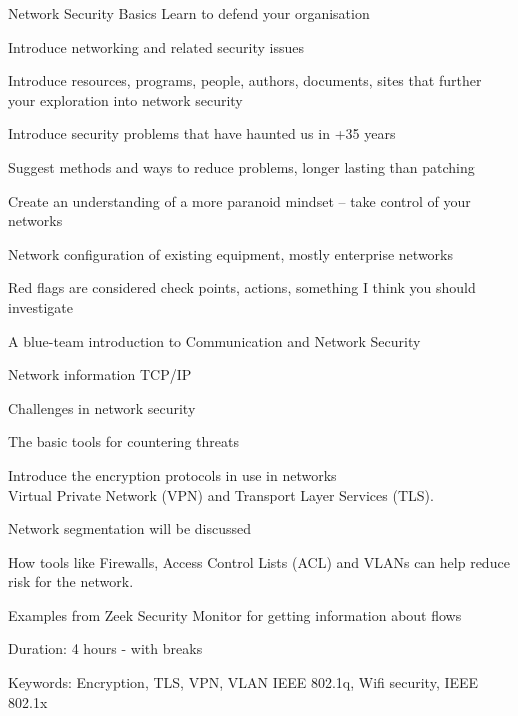 \documentclass[Screen16to9,17pt]{foils}
\begin{document}
\mytitlepage
{Network Security Basics}
{Learn to defend your organisation}

\hlkprofiluk




\begin{list2}
\item Introduce networking and related security issues
\item Introduce resources, programs, people, authors, documents, sites
 that further your exploration into network security
\item Introduce security problems that have haunted us in +35 years
\item Suggest methods and ways to reduce problems, longer lasting than patching
\item Create an understanding of a more paranoid mindset -- take control of your networks
\item Network configuration of existing equipment, mostly enterprise networks
{\myalert}
\end{list2}
{\small Red flags are considered check points, actions, something I think you should investigate}


A blue-team introduction to Communication and Network Security
\begin{list2}
\item Network information TCP/IP
\item Challenges in network security
\item The basic tools for countering threats
\item Introduce the encryption protocols in use in networks\\
Virtual Private Network (VPN) and Transport Layer Services (TLS).
\item Network segmentation will be discussed
\item How tools like Firewalls, Access Control Lists (ACL) and VLANs can help reduce risk for the network.
\item Examples from Zeek Security Monitor for getting information about flows
\end{list2}

Duration: 4 hours - with breaks

Keywords: Encryption, TLS, VPN, VLAN IEEE 802.1q, Wifi security, IEEE
802.1x


\end{document}
